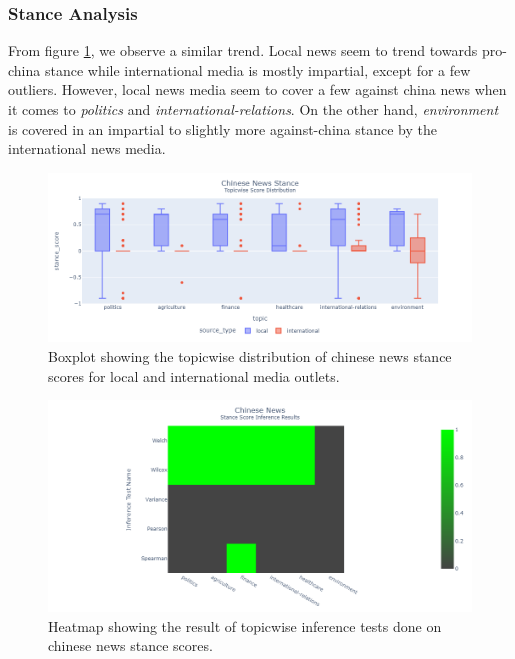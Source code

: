 \documentclass{article}
\theoremstyle{mytheoremstyle}
\theoremstyle{mytheoremstyle}
\theoremstyle{myproblemstyle}
\begin{document}
    \subsubsection{Stance Analysis}    

    From figure \ref{fig:china_stance_score_boxplot}, we observe a similar trend. Local news seem to trend towards pro-china stance while international media is mostly impartial, except for a few outliers. However, local news media seem to cover a few against china news when it comes to \emph{politics} and \emph{international-relations}. On the other hand, \emph{environment} is covered in an impartial to slightly more against-china stance by the international news media.
    
    \begin{figure}[hp]
        \centering
        \includegraphics[width=\linewidth]{../images/plots/China/china_boxplot_stance.png}
        \caption{Boxplot showing the topicwise distribution of chinese news stance scores for local and international media outlets.}
        \label{fig:china_stance_score_boxplot}
    \end{figure}

    \begin{figure}[hp]
        \centering
        \includegraphics[width=\linewidth]{../images/plots/China/china_heatmap_inference_stance.png}
        \caption{Heatmap showing the result of topicwise inference tests done on chinese news stance scores.}
        \label{fig:china_stance_score_heatmap}
    \end{figure}
\end{document}
